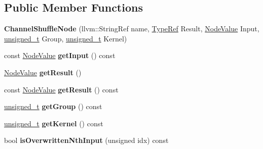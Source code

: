 \subsection*{Public Member Functions}
\begin{DoxyCompactItemize}
\item 
\mbox{\label{classglow_1_1_channel_shuffle_node_a0c785a5437a016e3b5e7490efc0756a4}} 
{\bfseries Channel\+Shuffle\+Node} (llvm\+::\+String\+Ref name, \hyperlink{structglow_1_1_type}{Type\+Ref} Result, \hyperlink{structglow_1_1_node_value}{Node\+Value} Input, \hyperlink{namespaceglow_a0ca574644e1e42ef193a9947fb4d8911}{unsigned\+\_\+t} Group, \hyperlink{namespaceglow_a0ca574644e1e42ef193a9947fb4d8911}{unsigned\+\_\+t} Kernel)
\item 
\mbox{\label{classglow_1_1_channel_shuffle_node_ab45c4ffc8fd63a2b444725582eb068be}} 
const \hyperlink{structglow_1_1_node_value}{Node\+Value} {\bfseries get\+Input} () const
\item 
\mbox{\label{classglow_1_1_channel_shuffle_node_a7497c55c49d904b191cf9b2785b6a2a1}} 
\hyperlink{structglow_1_1_node_value}{Node\+Value} {\bfseries get\+Result} ()
\item 
\mbox{\label{classglow_1_1_channel_shuffle_node_ac609d2c932ed5f27e5861229d00fb490}} 
const \hyperlink{structglow_1_1_node_value}{Node\+Value} {\bfseries get\+Result} () const
\item 
\mbox{\label{classglow_1_1_channel_shuffle_node_aa6e7643e7a6ac4e2580024c48c35d450}} 
\hyperlink{namespaceglow_a0ca574644e1e42ef193a9947fb4d8911}{unsigned\+\_\+t} {\bfseries get\+Group} () const
\item 
\mbox{\label{classglow_1_1_channel_shuffle_node_a3ee676a020b02431dfd23aff8f964485}} 
\hyperlink{namespaceglow_a0ca574644e1e42ef193a9947fb4d8911}{unsigned\+\_\+t} {\bfseries get\+Kernel} () const
\item 
\mbox{\label{classglow_1_1_channel_shuffle_node_a3525c145981db0a53ad89e0a0ec696c4}} 
bool {\bfseries is\+Overwritten\+Nth\+Input} (unsigned idx) const

\end{DoxyCompactItemize}
